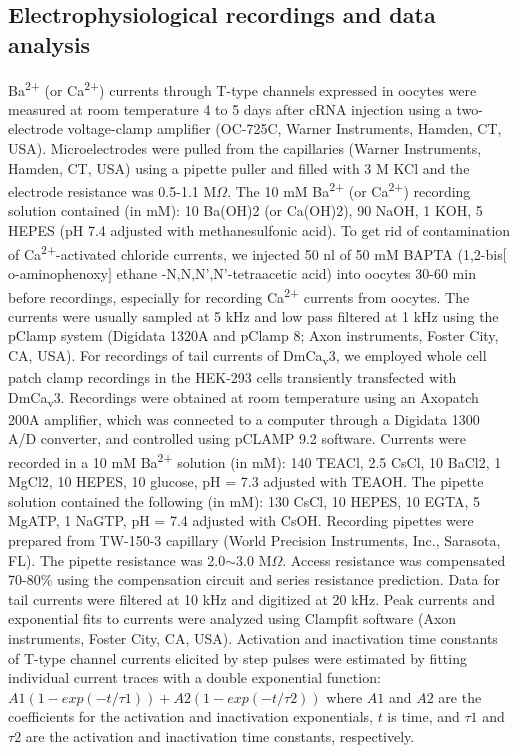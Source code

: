 \subsection*{Electrophysiological recordings and data analysis}

Ba\textsuperscript{2+} (or Ca\textsuperscript{2+}) currents through T-type channels expressed in oocytes were measured at room temperature 4 to 5 days after cRNA injection using a two-electrode voltage-clamp amplifier (OC-725C, Warner Instruments, Hamden, CT, USA).
Microelectrodes were pulled from the capillaries (Warner Instruments, Hamden, CT, USA) using a pipette puller and filled with 3 M KCl and the electrode resistance was 0.5-1.1 M$\Omega$.
The 10 mM Ba\textsuperscript{2+} (or Ca\textsuperscript{2+}) recording solution contained (in mM): 10 Ba(OH)2 (or Ca(OH)2), 90 NaOH, 1 KOH, 5 HEPES (pH 7.4 adjusted with methanesulfonic acid).
To get rid of contamination of Ca\textsuperscript{2+}-activated chloride currents, we injected 50 nl of 50 mM BAPTA (1,2-bis$[$o-aminophenoxy$]$ ethane -N,N,N\textquoteright,N\textquoteright-tetraacetic acid) into oocytes 30-60 min before recordings, especially for recording Ca\textsuperscript{2+} currents from oocytes.
The currents were usually sampled at 5 kHz and low pass filtered at 1 kHz using the pClamp system (Digidata 1320A and pClamp 8; Axon instruments, Foster City, CA, USA). 
For recordings of tail currents of DmCa\textsubscript{v}3, we employed whole cell patch clamp recordings in the HEK-293 cells transiently transfected with DmCa\textsubscript{v}3. 
Recordings were obtained at room temperature using an Axopatch 200A amplifier, which was connected to a computer through a Digidata 1300 A/D converter, and controlled using pCLAMP 9.2 software. 
Currents were recorded in a 10 mM Ba\textsuperscript{2+} solution (in mM): 140 TEACl, 2.5 CsCl, 10 BaCl2, 1 MgCl2, 10 HEPES, 10 glucose, pH = 7.3 adjusted with TEAOH. The pipette solution contained the following (in mM): 130 CsCl, 10 HEPES, 10 EGTA, 5 MgATP, 1 NaGTP, pH = 7.4 adjusted with CsOH. 
Recording pipettes were prepared from TW-150-3 capillary (World Precision Instruments, Inc., Sarasota, FL).
 The pipette resistance was 2.0$\sim$3.0 M$\Omega$. Access resistance was compensated 70-80\%{} using the compensation circuit and series resistance prediction. 
Data for tail currents were filtered at 10 kHz and digitized at 20 kHz. 
Peak currents and exponential fits to currents were analyzed using Clampfit software (Axon instruments, Foster City, CA, USA). 
Activation and inactivation time constants of T-type channel currents elicited by step pulses were estimated by fitting individual current traces with a double exponential function: $A1(1-exp(-t/\tau1)) + A2(1-exp(-t/\tau2))$ where $A1$ and $A2$ are the coefficients for the activation and inactivation exponentials, $t$ is time, and $\tau1$ and $\tau2$ are the activation and inactivation time constants, respectively.
